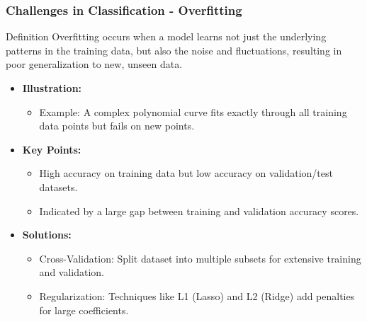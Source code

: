 \documentclass[aspectratio=169]{beamer}
\begin{document}
\begin{frame}[fragile]
  \frametitle{Challenges in Classification - Overfitting}
  \begin{block}{Definition}
    Overfitting occurs when a model learns not just the underlying patterns in the training data, but also the noise and fluctuations, resulting in poor generalization to new, unseen data.
  \end{block}
  
  \begin{itemize}
    \item \textbf{Illustration:}
      \begin{itemize}
        \item Example: A complex polynomial curve fits exactly through all training data points but fails on new points.
      \end{itemize}
    
    \item \textbf{Key Points:}
      \begin{itemize}
        \item High accuracy on training data but low accuracy on validation/test datasets.
        \item Indicated by a large gap between training and validation accuracy scores.
      \end{itemize}
    
    \item \textbf{Solutions:}
      \begin{itemize}
        \item Cross-Validation: Split dataset into multiple subsets for extensive training and validation.
        \item Regularization: Techniques like L1 (Lasso) and L2 (Ridge) add penalties for large coefficients.
      \end{itemize}
  \end{itemize}
\end{frame}
\end{document}
